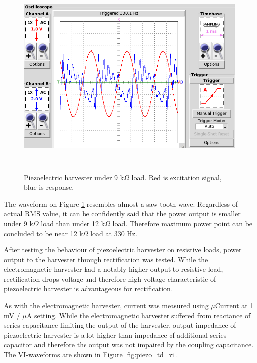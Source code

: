 \begin{figure}[htb]
\begin{center}
\includegraphics[height=10cm]{images/own_measurement/generator_shaker/piezo_td_9k_330hz_2_2.png}
\end{center}
\caption{\label{fig:piezo_td_9k} Piezoelectric harvester under 9 k$\Omega$ load. Red is excitation signal, blue is response.}
\end{figure}

The waveform on Figure \ref{fig:piezo_td_9k} resembles almost a saw-tooth wave. Regardless of actual RMS value, it can be confidently said that the power output is smaller under 9 k$\Omega$ load than under 12 k$\Omega$ load. Therefore maximum power point can be concluded to be near 12 k$\Omega$ load at 330 Hz. 

After testing the behaviour of piezoelectric harvester on resistive loads, power output to the harvester through rectification was tested. While the electromagnetic harvester had a notably higher output to resistive load, rectification drops voltage and therefore high-voltage characteristic of piezoelectric harvester is advantageous for rectification. 

As with the electromagnetic harvester, current was measured using $\mu$Current at 1 mV / $\mu$A setting. While the electromagnetic harvester suffered from reactance of series capacitance limiting the output of the harvester, output impedance of piezoelectric harvester is a lot higher than impedance of additional series capacitor and therefore the output was not impaired by the coupling capacitance. The VI-waveforms are shown in Figure \ref{fig:piezo_td_vi}. 

